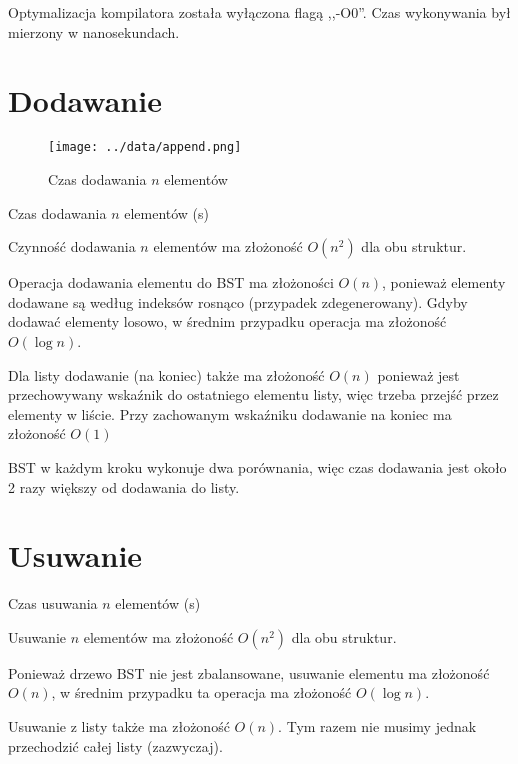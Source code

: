 \documentclass[11pt,twocolumn]{article}
\begin{document}
Optymalizacja kompilatora została wyłączona flagą ,,-O0''. Czas wykonywania był mierzony w nanosekundach.



\section{Dodawanie}

\begin{figure}[h]
	\texttt{[image: ../data/append.png]}
	\caption{Czas dodawania $n$ elementów \label{append}}
\end{figure}

\begin{table}[h]
	\centering
	\caption{Czas dodawania $n$ elementów (s)}
\end{table}

Czynność dodawania $n$ elementów ma złożoność $O(n^2)$ dla obu struktur.

Operacja dodawania elementu do BST ma złożoności $O(n)$, ponieważ elementy dodawane są według indeksów rosnąco (przypadek zdegenerowany). Gdyby dodawać elementy losowo, w średnim przypadku operacja ma złożoność $O(\log n)$.

Dla listy dodawanie (na koniec) także ma złożoność $O(n)$ ponieważ jest przechowywany wskaźnik do ostatniego elementu listy, więc trzeba przejść przez elementy w liście. Przy zachowanym wskaźniku dodawanie na koniec ma złożoność $O(1)$

BST w każdym kroku wykonuje dwa porównania, więc czas dodawania jest około 2 razy większy od dodawania do listy.



\section{Usuwanie}

\begin{table}[h!]
	\centering
	\caption{Czas usuwania $n$ elementów (s)}
\end{table}

Usuwanie $n$ elementów ma złożoność $O(n^2)$ dla obu struktur.

Ponieważ drzewo BST nie jest zbalansowane, usuwanie elementu ma złożoność $O(n)$, w średnim przypadku ta operacja ma złożoność $O(\log n)$.

Usuwanie z listy także ma złożoność $O(n)$. Tym razem nie musimy jednak przechodzić całej listy (zazwyczaj).
\end{document}
